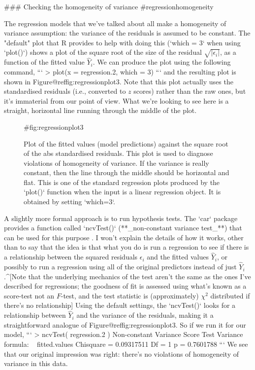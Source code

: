 ### Checking the homogeneity of variance {#regressionhomogeneity}

The regression models that we've talked about all make a homogeneity of variance assumption: the variance of the residuals is assumed to be constant. The "default" plot that R provides to help with doing this (`which = 3` when using `plot()`) shows a plot of the square root of the size of the residual $\sqrt{|\epsilon_i|}$, as a function of the fitted value $\hat{Y}_i$. We can produce the plot using the following command,
```
> plot(x = regression.2, which = 3)
```
and the resulting plot is shown in Figure@reffig:regressionplot3. Note that this plot actually uses the standardised residuals (i.e., converted to $z$ scores) rather than the raw ones, but it's immaterial from our point of view. What we're looking to see here is a straight, horizontal line running through the middle of the plot.

\begin{figure}[t]
\begin{center}
\caption{Plot of the fitted values (model predictions) against the square root of the abs standardised residuals. This plot is used to diagnose violations of homogeneity of variance. If the variance is really constant, then the line through the middle should be horizontal and flat. This is one of the standard regression plots produced by the `plot()` function when the input is a linear regression object. It is obtained by setting `which=3`.}
\HR
{#fig:regressionplot3}
\end{center}
\end{figure}


A slightly more formal approach is to run hypothesis tests. The `car` package provides a function called `ncvTest()` (**_non-constant variance test_**) that can be used for this purpose \cite{Cook1983}. I won't explain the details of how it works, other than to say that the idea is that what you do is run a regression to see if there is a relationship between the squared residuals $\epsilon_i$ and the fitted values $\hat{Y}_i$, or possibly to run a regression using all of the original predictors instead of just $\hat{Y}_i$.^[Note that the underlying mechanics of the test aren't the same as the ones I've described for regressions; the goodness of fit is assessed using what's known as a score-test not an $F$-test, and the test statistic is (approximately) $\chi^2$ distributed if there's no relationship] Using the default settings, the `ncvTest()` looks for a relationship between $\hat{Y}_i$ and the variance of the residuals, making it a straightforward analogue of Figure@reffig:regressionplot3. So if we run it for our model,
```
> ncvTest( regression.2 )
Non-constant Variance Score Test 
Variance formula: ~ fitted.values 
Chisquare = 0.09317511    Df = 1     p = 0.7601788 
```
We see that our original impression was right: there's no violations of homogeneity of variance in this data.

